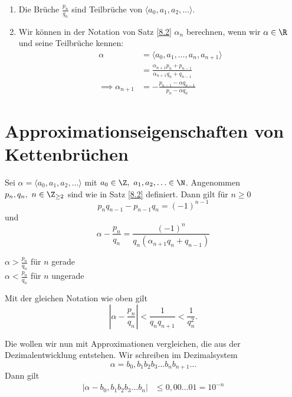 \begin{rem*}
	\begin{enumerate}[label={\roman*})]
		\item Die Brüche  $\frac{p_n}{q_n}$ sind Teilbrüche von $\langle a_0,a_1,a_2,\dotsc\rangle.$
		\item Wir können in der Notation von Satz \ref{8.2} $\alpha_n$ berechnen, wenn wir $\alpha \in \R$ und seine Teilbrüche kennen:
		\begin{align*}
			\alpha &= \langle a_0,a_1,\dotsc,a_n,a_{n+1}\rangle\\
			&= \frac{\alpha_{n+1} p_n + p_{n-1}}{\alpha_{n+1} q_n + q_{n-1}}\\
			\implies \alpha_{n+1} &= - \frac{p_{n-1} - \alpha q_{n-1}}{p_n - \alpha q_n}
		\end{align*}
	\end{enumerate}
\end{rem*}

\section{Approximationseigenschaften von Kettenbrüchen}

\begin{thm}\autolabel
	Sei $\alpha = \langle a_0,a_1,a_2,\dotsc \rangle$ mit $a_0 \in \Z,\ a_1,a_2,\dotsc \in \N$. Angenommen $p_n,q_n,\ n \in \Z_{\geq 2}$ sind wie in Satz \ref{8.2} definiert. Dann gilt für $n \geq 0$
	\[ p_n q_{n-1} - p_{n-1} q_n = (-1)^{n-1} \]
	und
	\[ \alpha - \frac{p_n}{q_n} = \frac{(-1)^n}{q_n(\alpha_{n+1} q_n + q_{n-1})} \]
\end{thm}

\begin{cor*}
	\( \alpha > \frac{p_n}{q_n} \) für $n$ gerade\\
	\( \alpha < \frac{p_n}{q_n} \) für $n$ ungerade
\end{cor*}

\begin{cor*}
	Mit der gleichen Notation wie oben gilt
	\[ \left| \alpha - \frac{p_n}{q_n} \right| < \frac{1}{q_nq_{n+1}} < \frac{1}{q_n^2}. \]
\end{cor*}

Die wollen wir nun mit Approximationen vergleichen, die aus der Dezimalentwicklung entstehen. Wir schreiben im Dezimalsystem
\[ \alpha = b_0,b_1b_2b_3 \dots b_nb_{n+1} \dots \]
Dann gilt
\begin{align*}
	|\alpha - b_0,b_1b_2b_3 \dots b_n| &\leq 0,00\dots01 = 10^{-n}
\end{align*}